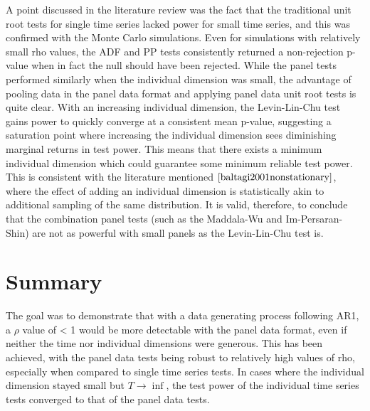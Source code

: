 A point discussed in the literature review was the fact that the traditional unit root tests for single time series lacked power for small time series, and this was confirmed with the Monte Carlo simulations. Even for simulations with relatively small rho values, the ADF and PP tests consistently returned a non-rejection p-value when in fact the null should have been rejected. While the panel tests performed similarly when the individual dimension was small, the advantage of pooling data in the panel data format and applying panel data unit root tests is quite clear. With an increasing individual dimension, the Levin-Lin-Chu test gains power to quickly converge at a consistent mean p-value, suggesting a saturation point where increasing the individual dimension sees diminishing marginal returns in test power. This means that there exists a minimum individual dimension which could guarantee some minimum reliable test power. This is consistent with the literature mentioned $\cite{baltagi2001nonstationary}$, where the effect of adding an individual dimension is statistically akin to additional sampling of the same distribution. It is valid, therefore, to conclude that the combination panel tests (such as the Maddala-Wu and Im-Persaran-Shin) are not as powerful with small panels as the Levin-Lin-Chu test is.


\section{Summary}

The goal was to demonstrate that with a data generating process following AR1, a $\rho$ value of < 1 would be more detectable with the panel data format, even if neither the time nor individual dimensions were generous. This has been achieved, with the panel data tests being robust to relatively high values of rho, especially when compared to single time series tests. In cases where the individual dimension stayed small but $T \to \inf$, the test power of the individual time series tests converged to that of the panel data tests.

